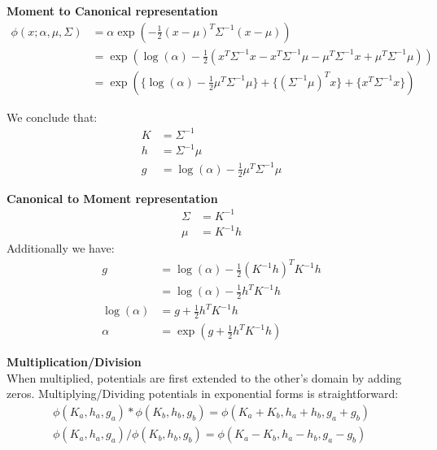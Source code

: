 \documentclass[11pt]{article}
\newcommand{\subsubsubsection}[1]{\noindent\textbf{#1}\\}
\begin{document}
\subsubsubsection{Moment to Canonical representation}
\begin{align*}
\phi(x; \alpha, \mu, \Sigma) &= \alpha \exp ( -\frac{1}{2} (x-\mu)^T\Sigma^{-1}(x-\mu)) \\
&= \exp ( \log (\alpha) - \frac{1}{2}(x^T\Sigma^{-1}x
                                     -x^T\Sigma^{-1}\mu
                                     -\mu^T\Sigma^{-1}x
                                     +\mu^T\Sigma^{-1}\mu
                                      ))\\
&= \exp ( \{\log (\alpha) - \frac{1}{2}\mu^T\Sigma^{-1}\mu\} + \{(\Sigma^{-1}\mu)^T x\} + \{x^T\Sigma^{-1}x\} )
\end{align*}

We conclude that:
\begin{align}
K &= \Sigma^{-1}\\
h &=\Sigma^{-1}\mu\\
g &= \log (\alpha) - \frac{1}{2}\mu^T\Sigma^{-1}\mu
\end{align}

\subsubsubsection{Canonical to Moment representation}
\begin{align}
\Sigma &= K^{-1}\\
\mu &=K^{-1}h \label{meanhCanonical}
\end{align}
Additionally we have:
\begin{align}
g&= \log (\alpha) - \frac{1}{2}(K^{-1}h)^TK^{-1}h \nonumber\\
&= \log (\alpha) - \frac{1}{2}h^TK^{-1}h \nonumber\\
\log (\alpha) &= g + \frac{1}{2}h^TK^{-1}h \nonumber\\
\alpha &= \exp(g + \frac{1}{2}h^TK^{-1}h )
\end{align}

\subsubsubsection{Multiplication/Division}
When multiplied, potentials are first extended to the other's domain by adding zeros. Multiplying/Dividing potentials in exponential forms is straightforward:
\begin{align}
\phi(K_a, h_a, g_a)*\phi(K_b, h_b, g_b) = \phi(K_a + K_b, h_a + h_b, g_a + g_b)\\
\phi(K_a, h_a, g_a)/\phi(K_b, h_b, g_b) = \phi(K_a - K_b, h_a - h_b, g_a - g_b)
\end{align}
\end{document}
